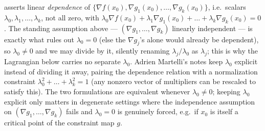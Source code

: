 \begin{remark}
 asserts linear \emph{dependence} of
$\{\nabla f(x_0), \nabla g_1(x_0), \dots, \nabla g_k(x_0)\}$, i.e.\ scalars
$\lambda_0, \lambda_1, \dots, \lambda_k$, not all zero, with
$\lambda_0 \nabla f(x_0) + \lambda_1 \nabla g_1(x_0) + \dots + \lambda_k \nabla g_k(x_0) = 0$.
The standing assumption above --- $(\nabla g_1,\dots,\nabla g_k)$ linearly independent --- is
exactly what rules out $\lambda_0 = 0$ (else the $\nabla g_j$'s alone would already be dependent),
so $\lambda_0 \neq 0$ and we may divide by it, silently renaming $\lambda_j/\lambda_0$ as
$\lambda_j$; this is why the Lagrangian below carries no separate $\lambda_0$. Adrien Martelli's
notes keep $\lambda_0$ explicit instead of dividing it away, pairing the dependence relation with
a normalization constraint $\lambda_0^2 + \dots + \lambda_k^2 = 1$ (any nonzero vector of
multipliers can be rescaled to satisfy this). The two formulations are equivalent whenever
$\lambda_0 \neq 0$; keeping $\lambda_0$ explicit only matters in degenerate settings where the
independence assumption on $(\nabla g_1,\dots,\nabla g_k)$ fails and $\lambda_0 = 0$ is genuinely
forced, e.g.\ if $x_0$ is itself a critical point of the constraint map $g$.
\end{remark}

\begin{center}
\end{center}

